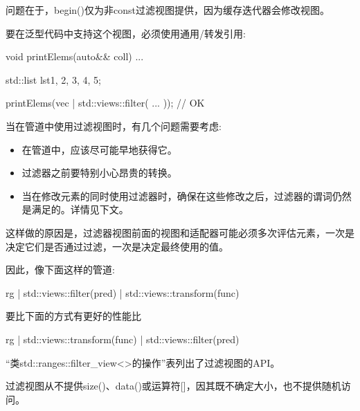 问题在于，begin()仅为非const过滤视图提供，因为缓存迭代器会修改视图。

要在泛型代码中支持这个视图，必须使用通用/转发引用:

\begin{cpp}
void printElems(auto&& coll) {
	...
}

std::list lst{1, 2, 3, 4, 5};

printElems(vec | std::views::filter( ... )); // OK
\end{cpp}


当在管道中使用过滤视图时，有几个问题需要考虑:

\begin{itemize}
\item
在管道中，应该尽可能早地获得它。

\item
过滤器之前要特别小心昂贵的转换。

\item
当在修改元素的同时使用过滤器时，确保在这些修改之后，过滤器的谓词仍然是满足的。详情见下文。
\end{itemize}

这样做的原因是，过滤器视图前面的视图和适配器可能必须多次评估元素，一次是决定它们是否通过过滤，一次是决定最终使用的值。

因此，像下面这样的管道:

\begin{cpp}
rg | std::views::filter(pred) | std::views::transform(func)
\end{cpp}

要比下面的方式有更好的性能比

\begin{cpp}
rg | std::views::transform(func) | std::views::filter(pred)
\end{cpp}


“类std::ranges::filter\_view<>的操作”表列出了过滤视图的API。

过滤视图从不提供size()、data()或运算符[]，因其既不确定大小，也不提供随机访问。

